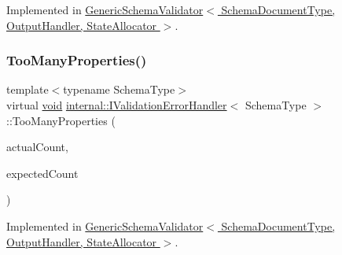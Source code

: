 Implemented in \hyperlink{classGenericSchemaValidator_a78e85eeae0e2bdef827815672a7fbbc9}{Generic\+Schema\+Validator$<$ Schema\+Document\+Type, Output\+Handler, State\+Allocator $>$}.

\mbox{\label{classinternal_1_1IValidationErrorHandler_a3494e9d2bff94979649e186aba71b32e}} 
\subsubsection{\texorpdfstring{Too\+Many\+Properties()}{TooManyProperties()}}
{\footnotesize\ttfamily template$<$typename Schema\+Type$>$ \\
virtual \hyperlink{imgui__impl__opengl3__loader_8h_ac668e7cffd9e2e9cfee428b9b2f34fa7}{void} \hyperlink{classinternal_1_1IValidationErrorHandler}{internal\+::\+I\+Validation\+Error\+Handler}$<$ Schema\+Type $>$\+::Too\+Many\+Properties (\begin{DoxyParamCaption}\item[{\hyperlink{rapidjson_8h_a5ed6e6e67250fadbd041127e6386dcb5}{Size\+Type}}]{actual\+Count,  }\item[{\hyperlink{rapidjson_8h_a5ed6e6e67250fadbd041127e6386dcb5}{Size\+Type}}]{expected\+Count }\end{DoxyParamCaption})\hspace{0.3cm}{\ttfamily [pure virtual]}}



Implemented in \hyperlink{classGenericSchemaValidator_ad7ca0a327420c110e9ee6e70b2cdbc87}{Generic\+Schema\+Validator$<$ Schema\+Document\+Type, Output\+Handler, State\+Allocator $>$}.

\mbox{\label{classinternal_1_1IValidationErrorHandler_a57f0cd2c2c9781af0e4c447700537f23}} 
